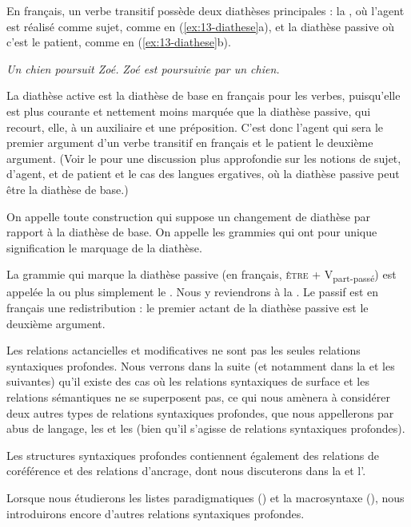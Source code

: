 En français, un verbe transitif possède deux diathèses principales : la , où l'agent est réalisé comme sujet, comme en (\ref{ex:13-diathese}a),  et la diathèse passive où c'est le patient, comme en (\ref{ex:13-diathese}b).

\ea\label{ex:13-diathese}
\ea \textit{Un chien poursuit Zoé.}
\ex \textit{Zoé est poursuivie par un chien.}\z\z

La diathèse active est la diathèse de base en français pour les verbes, puisqu'elle est plus courante et nettement moins marquée que la diathèse passive, qui recourt, elle, à un auxiliaire et une préposition. C'est donc l'agent qui sera le premier argument d'un verbe transitif en français et le patient le deuxième argument. (Voir le  pour une discussion plus approfondie sur les notions de sujet, d'agent, et de patient et le cas des langues ergatives, où la diathèse passive peut être la diathèse de base.)

{On appelle  toute construction qui suppose un changement de diathèse par rapport à la diathèse de base. On appelle  les grammies qui ont pour unique signification le marquage de la diathèse.}

La grammie qui marque la diathèse passive (en français, \textsc{être} + V\textsubscript{part-passé}) est appelée la  ou plus simplement le . Nous y reviendrons à la . Le passif est en français une redistribution : le premier actant de la diathèse passive est le deuxième argument.

Les relations actancielles et modificatives ne sont pas les seules relations syntaxiques profondes.
Nous verrons dans la suite (et notamment dans la  et les suivantes) qu’il existe des cas où les relations syntaxiques de surface et les relations sémantiques ne se superposent pas, ce qui nous amènera à considérer deux autres types de relations syntaxiques profondes, que nous appellerons par abus de langage, les  et les  (bien qu'il s'agisse de relations syntaxiques profondes).

Les structures syntaxiques profondes contiennent également des relations de coréférence et des relations d’ancrage, dont nous discuterons dans la  et l’.

Lorsque nous étudierons les listes paradigmatiques () et la macrosyntaxe (), nous introduirons encore d’autres relations syntaxiques profondes.

